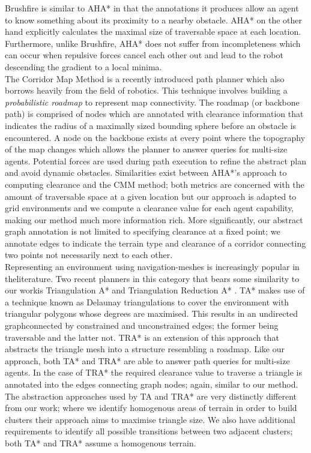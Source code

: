 Brushfire is similar to AHA* in that the annotations it produces allow an agent to know something about its proximity to a nearby obstacle. AHA* on the other hand explicitly calculates the maximal size of traversable space at each location. Furthermore, unlike Brushfire, AHA* does not suffer from incompleteness which can occur when repulsive forces cancel each other out and lead to the robot descending the gradient to a local minima.\\ \newline
The Corridor Map Method \cite{geraerts07} is a recently introduced path planner which also borrows heavily from the field of robotics. This technique involves building a \emph{probabilistic roadmap} to represent map connectivity. The roadmap (or backbone path) is comprised of nodes which are annotated with clearance information that indicates the radius of a maximally sized bounding sphere before an obstacle is encountered. A node on the backbone exists at every point where the topography of the map changes which allows the planner to answer queries for multi-size agents. Potential forces are used during path execution to refine the abstract plan and avoid dynamic obstacles. \newline
Similarities exist between AHA*'s approach to computing clearance and the CMM  method; both metrics are concerned with the amount of traversable space at a given location but our approach is adapted to grid environments and we compute a clearance value for each agent capability, making our method much more information rich. More significantly, our abstract graph annotation is not limited to specifying clearance at a fixed point; we annotate edges to indicate the terrain type and clearance of a corridor connecting two points not necessarily next to each other. \\ \newline
Representing an environment using navigation-meshes is increasingly popular in theliterature. Two recent planners in this category that bears some similarity to our workis Triangulation A* and Triangulation Reduction A* \cite{demyen07}. TA* makes use of a technique known as Delaunay triangulations to cover the environment with triangular polygons whose degrees are maximised. This results in an undirected graphconnected by constrained and unconstrained edges; the former being traversable and the latter not. TRA* is an extension of this approach that abstracts the triangle mesh into a structure resembling a roadmap. 
Like our approach, both TA* and TRA* are able to answer path queries for multi-size agents. In the case of TRA* the required clearance value to traverse a triangle is annotated into the edges connecting graph nodes; again, similar to our method. The abstraction approaches used by TA and TRA* are very distinctly different from our work; where we identify homogenous areas of terrain in order to build clusters their approach aims to maximise triangle size. We also have additional requirements to identify all possible transitions between two adjacent clusters; both TA* and TRA* assume a homogenous terrain.

